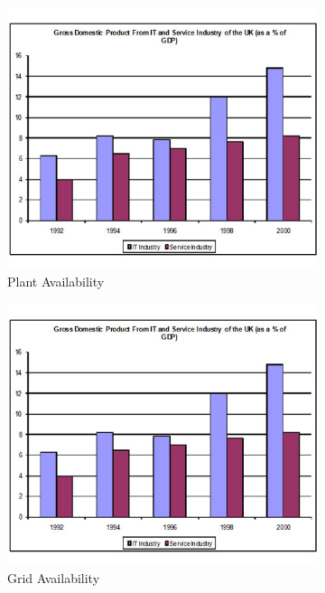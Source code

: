 \documentclass[18pt]{article}
\begin{document}
\begin{figure}
\begin{subfigure}[b]{0.3\textwidth}
	\centering
	\includegraphics[width=\textwidth]{figures/sample1.jpeg}
	\caption{Plant Availability}
	\label{fig:y equals x}
\end{subfigure}
\hfill
\begin{subfigure}[b]{0.3\textwidth}
	\centering
	\includegraphics[width=\textwidth]{figures/sample1.jpeg}
	\caption{Grid Availability}
	\label{fig:y equals x}
\end{subfigure}
\hfill
\begin{subfigure}[b]{0.3\textwidth}

\end{subfigure}
\end{figure}
\end{document}
